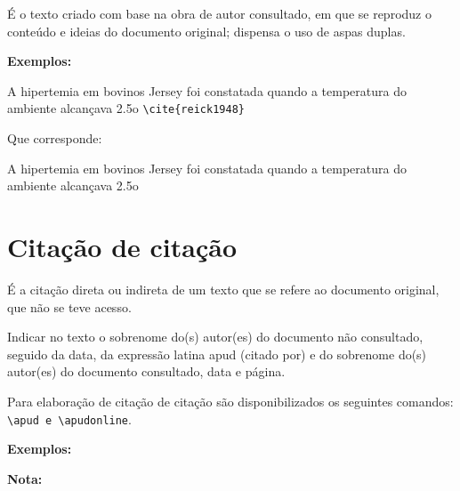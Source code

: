 É o texto criado com base na obra de autor consultado, em que se reproduz o conteúdo e ideias do documento original; dispensa o uso de aspas duplas.

\textbf{Exemplos:}

A hipertemia em bovinos Jersey foi constatada quando a temperatura do ambiente
alcançava 2.5o \verb+\cite{reick1948}+

Que corresponde:

A hipertemia em bovinos Jersey foi constatada quando a temperatura do ambiente
alcançava 2.5o \cite{reick1948}


\section{Citação de citação}

É a citação direta ou indireta de um texto que se refere ao documento original, que não se teve acesso.

Indicar no texto o sobrenome do(s) autor(es) do documento não consultado, seguido da data, da expressão latina apud (citado por) e do sobrenome do(s) autor(es) do documento consultado, data e página. 

Para elaboração de citação de citação são disponibilizados os seguintes comandos: \verb+\apud e \apudonline+.

\textbf{Exemplos:}

\textbf{Nota:}

